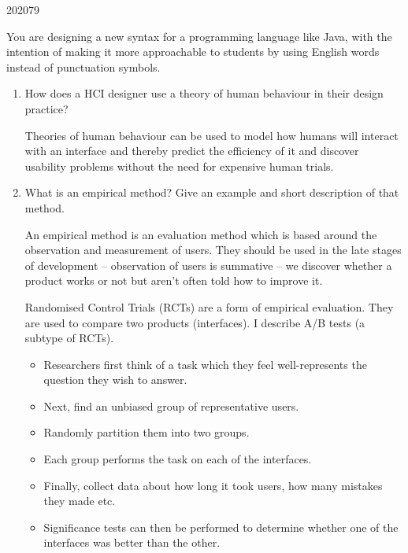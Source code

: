 \documentclass[10pt,\jkfside,a4paper]{article}
\begin{document}
\begin{examquestion}{2020}{7}{9}

You are designing a new syntax for a programming language like Java, with
the intention of making it more approachable to students by using English
words instead of punctuation symbols.

\begin{enumerate}

\item How does a HCI designer use a theory of human behaviour in their
design practice?

Theories of human behaviour can be used to model how humans will interact
with an interface and thereby predict the efficiency of it and discover
usability problems without the need for expensive human trials.

\item What is an empirical method? Give an example and short description of
that method.

An empirical method is an evaluation method which is based around the
observation and measurement of users. They should be used in the late
stages of development -- observation of users is summative -- we discover
whether a product works or not but aren't often told how to improve it.

Randomised Control Trials (RCTs) are a form of empirical evaluation. They
are used to compare two products (interfaces). I describe A/B tests (a
subtype of RCTs).

\begin{itemize}

\item Researchers first think of a task which they feel well-represents the
question they wish to answer.

\item Next, find an unbiased group of representative users.

\item Randomly partition them into two groups.

\item Each group performs the task on each of the interfaces.

\item Finally, collect data about how long it took users, how many
mistakes they made etc.

\item Significance tests can then be performed to determine whether one of
the interfaces was better than the other.


\end{itemize}
\end{enumerate}
\end{examquestion}
\end{document}
